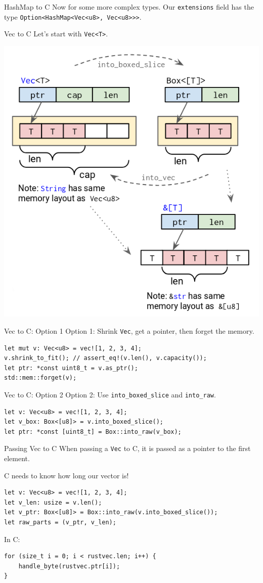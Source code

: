 \documentclass[aspectratio=1610,14pt,t]{beamer}
\begin{document}
\begin{frame}[c]{HashMap to C}
  Now for some more complex types. Our \texttt{extensions} field has
  the type \texttt{Option<HashMap<Vec<u8>, Vec<u8>>>}.
\end{frame}

\begin{frame}[c]{Vec to C}
  Let's start with \texttt{Vec<T>}.

  \includegraphics[width=.5\textwidth]{img/vec.png}
\end{frame}

\begin{frame}[c,fragile]{Vec to C: Option 1}
  Option 1: Shrink \texttt{Vec}, get a pointer, then forget the memory.

  \begin{verbatim}
let mut v: Vec<u8> = vec![1, 2, 3, 4];
v.shrink_to_fit(); // assert_eq!(v.len(), v.capacity());
let ptr: *const uint8_t = v.as_ptr();
std::mem::forget(v);
  \end{verbatim}
\end{frame}

\begin{frame}[c,fragile]{Vec to C: Option 2}
  Option 2: Use \texttt{into\_boxed\_slice} and \texttt{into\_raw}.

  \begin{verbatim}
let v: Vec<u8> = vec![1, 2, 3, 4];
let v_box: Box<[u8]> = v.into_boxed_slice();
let ptr: *const [uint8_t] = Box::into_raw(v_box);
  \end{verbatim}
\end{frame}

\begin{frame}[c,fragile]{Passing Vec to C}
  When passing a \texttt{Vec} to C, it is passed as a pointer to the first
  element.

  C needs to know how long our vector is!

  \begin{verbatim}
let v: Vec<u8> = vec![1, 2, 3, 4];
let v_len: usize = v.len();
let v_ptr: Box<[u8]> = Box::into_raw(v.into_boxed_slice());
let raw_parts = (v_ptr, v_len);
  \end{verbatim}

  In C:

  \begin{verbatim}
for (size_t i = 0; i < rustvec.len; i++) {
    handle_byte(rustvec.ptr[i]);
}
  \end{verbatim}
\end{frame}
\end{document}

